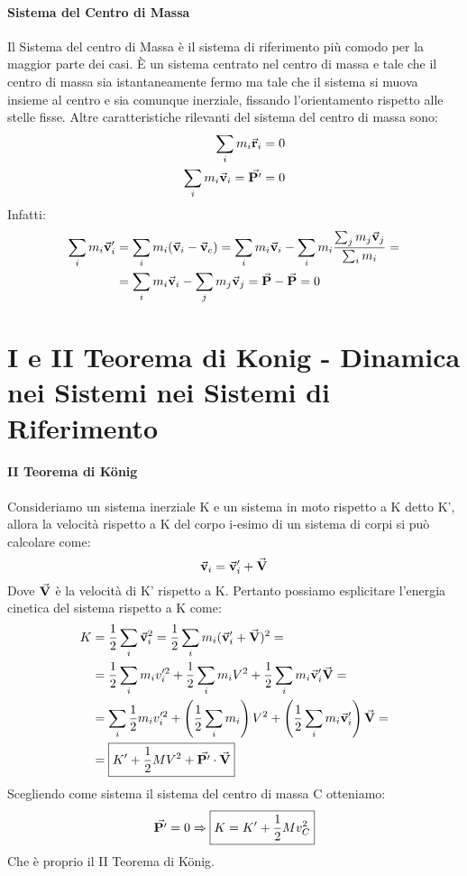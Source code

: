 \documentclass{article}
\newcommand{\then}{\ensuremath{\Rightarrow}}
\renewcommand{\v}{\va{v}}
\renewcommand{\r}{\va{r}}
\begin{document}
\paragraph{Sistema del Centro di Massa}
Il Sistema del centro di Massa è il sistema di riferimento più comodo per la maggior parte dei casi. È un sistema centrato nel centro di massa e tale che il centro di massa sia istantaneamente fermo ma tale che il sistema si muova insieme al centro e sia comunque inerziale, fissando l'orientamento rispetto alle stelle fisse. Altre caratteristiche rilevanti del sistema del centro di massa sono:
\begin{align*}
    \sum_im_i\r_i=0\\
    \sum_im_i\v_i=\va{P'}=0
\end{align*}
Infatti:
\begin{equation}
\begin{split}
    \sum_im_i\v_i'&=\sum_im_i(\v_i-\v_c)=\sum_im_i\v_i-\sum_im_i\frac{\sum_jm_j\v_j}{\sum_im_i}=\\
    &=\sum_im_i\v_i-\sum_jm_j\v_j=\va{P}-\va{P}=0
\end{split}
\end{equation}

\section{I e II Teorema di Konig - Dinamica nei Sistemi nei Sistemi di Riferimento}
\paragraph{II Teorema di König}
Consideriamo un sistema inerziale K e un sistema in moto rispetto a K detto K', allora la velocità rispetto a K del corpo i-esimo di un sistema di corpi si può calcolare come:
\[\v_i=\v_i'+\va{V}\]
Dove $\va{V}$ è la velocità di K' rispetto a K. Pertanto possiamo esplicitare l'energia cinetica del sistema rispetto a K come:
\begin{equation}
\begin{split}
    K&=\frac{1}{2}\sum_i\v_i^2=\frac{1}{2}\sum_im_i(\v_i'+\va{V})^2=\\
    &=\frac{1}{2}\sum_im_iv_i'^2+\frac{1}{2}\sum_im_iV^2+\frac{1}{2}\sum_im_i\v_i'\va{V}=\\
    &=\sum_i\frac{1}{2}m_iv_i'^2+\left(\frac{1}{2}\sum_im_i\right)V^2+\left(\frac{1}{2}\sum_im_i\v_i'\right)\va{V}=\\
    &=\boxed{K'+\frac{1}{2}MV^2+\va{P'}\cdot\va{V}}
\end{split}    
\end{equation}
Scegliendo come sistema il sistema del centro di massa C otteniamo:
\begin{equation}
    \va{P'}=0\then \boxed{K=K'+\frac{1}{2}Mv_C^2}
\end{equation}
Che è proprio il II Teorema di König.
\end{document}
